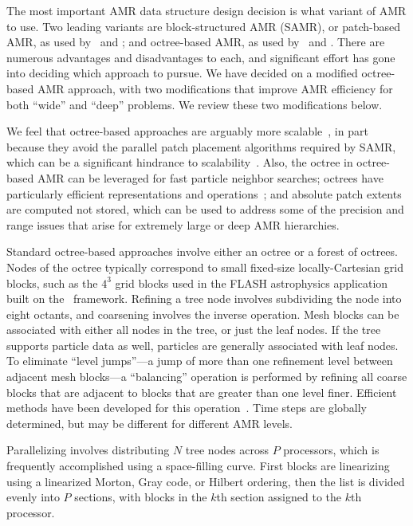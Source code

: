 \documentclass[10pt,twocolumn]{article}
\begin{document}
The most important AMR data structure design decision is what variant
of AMR to use.  Two leading variants are block-structured AMR (SAMR),
or patch-based AMR, as used by \samrai\ and \chombo; and octree-based
AMR, as used by \paramesh\ and \alps.  There are numerous advantages
and disadvantages to each, and significant effort has gone into
deciding which approach to pursue.  We have decided on a modified
octree-based AMR approach, with two modifications that improve AMR
efficiency for both ``wide'' and ``deep'' problems.  We review these
two modifications below.

We feel that octree-based approaches are arguably more
scalable~\cite{BuGh08}, in part because they avoid the parallel patch
placement algorithms required by SAMR, which can be a significant
hindrance to scalability~\cite{GuWi06}.  
Also, the octree in octree-based AMR can be leveraged for fast
particle neighbor searches; octrees have particularly efficient
representations and operations~\cite{FrPe02}; and absolute patch
extents are computed not stored, which can be used to address some of
the precision and range issues that arise for extremely large or deep
AMR hierarchies.

Standard octree-based approaches involve either an octree or a forest
of octrees.  Nodes of the octree typically correspond to small
fixed-size locally-Cartesian grid blocks, such as the $4^3$ grid
blocks used in the FLASH astrophysics application built on the
\paramesh\ framework.  Refining a tree node involves subdividing the
node into eight octants, and coarsening involves the inverse
operation.  Mesh blocks can be associated with either all nodes in the
tree, or just the leaf nodes.  If the tree supports particle data as
well, particles are generally associated with leaf nodes.  To
eliminate ``level jumps''---a jump of more than one refinement level
between adjacent mesh blocks---a ``balancing'' operation is performed
by refining all coarse blocks that are adjacent to blocks that are
greater than one level finer.  Efficient methods have been developed
for this operation~\cite{@@@fast-balance}.  Time steps are globally
determined, but may be different for different AMR levels.

Parallelizing involves distributing $N$ tree nodes across $P$
processors, which is frequently accomplished using a space-filling
curve.  First blocks are linearizing using a linearized Morton, Gray
code, or Hilbert ordering, then the list is divided evenly into $P$
sections, with blocks in the $k$th section assigned to the $k$th
processor.
\end{document}
